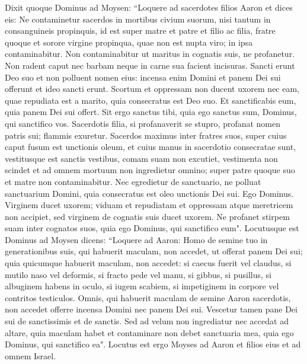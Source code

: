 \begin{biblechapter}  
\verse Dixit quoque Dominus ad Moysen: “Loquere ad sacerdotes filios Aaron et dices eis: Ne contaminetur sacerdos in mortibus civium suorum, 
\verse nisi tantum in consanguineis propinquis, id est super matre et patre et filio ac filia, fratre quoque 
\verse et sorore virgine propinqua, quae non est nupta viro; in ipsa contaminabitur. 
\verse Non contaminabitur ut maritus in cognatis suis, ne profanetur. 
\verse Non radent caput nec barbam neque in carne sua facient incisuras. 
\verse Sancti erunt Deo suo et non polluent nomen eius: incensa enim Domini et panem Dei sui offerunt et ideo sancti erunt. 
\verse Scortum et oppressam non ducent uxorem nec eam, quae repudiata est a marito, quia consecratus est Deo suo. 
\verse Et sanctificabis eum, quia panem Dei sui offert. Sit ergo sanctus tibi, quia ego sanctus sum, Dominus, qui sanctifico vos. 
\verse Sacerdotis filia, si profanaverit se stupro, profanat nomen patris sui; flammis exuretur. 
\verse Sacerdos maximus inter fratres suos, super cuius caput fusum est unctionis oleum, et cuius manus in sacerdotio consecratae sunt, vestitusque est sanctis vestibus, comam suam non excutiet, vestimenta non scindet 
\verse et ad omnem mortuum non ingredietur omnino; super patre quoque suo et matre non contaminabitur. 
\verse Nec egredietur de sanctuario, ne polluat sanctuarium Domini, quia consecratus est oleo unctionis Dei sui. Ego Dominus. 
\verse Virginem ducet uxorem; 
\verse viduam et repudiatam et oppressam atque meretricem non accipiet, sed virginem de cognatis suis ducet uxorem. 
\verse Ne profanet stirpem suam inter cognatos suos, quia ego Dominus, qui sanctifico eum". 
\verse Locutusque est Dominus ad Moysen dicens: 
\verse “Loquere ad Aaron: Homo de semine tuo in generationibus suis, qui habuerit maculam, non accedet, ut offerat panem Dei sui; 
\verse quia quicumque habuerit maculam, non accedet: si caecus fuerit vel claudus, si mutilo naso vel deformis, 
\verse si fracto pede vel manu,  
\verse si gibbus, si pusillus, si albuginem habens in oculo, si iugem scabiem, si impetiginem in corpore vel contritos testiculos. 
\verse Omnis, qui habuerit maculam de semine Aaron sacerdotis, non accedet offerre incensa Domini nec panem Dei sui. 
\verse Vescetur tamen pane Dei sui de sanctissimis et de sanctis. 
\verse Sed ad velum non ingrediatur nec accedat ad altare, quia maculam habet et contaminare non debet sanctuaria mea, quia ego Dominus, qui sanctifico ea". 
\verse Locutus est ergo Moyses ad Aaron et filios eius et ad omnem Israel. 
\end{biblechapter}

